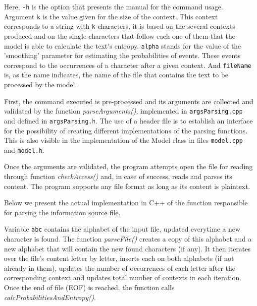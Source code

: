 \documentclass[12pt]{article}
\begin{document}
Here, \texttt{-h} is the option that presents the manual for the command usage.
Argument \texttt{k} is the value given for the size of the context.
This context corresponds to a string with \texttt{k} characters, it is based on
the several contexts produced and on the single characters that follow each one
of them that the model is able to calculate the text's entropy.
\texttt{alpha} stands for the value of the 'smoothing' parameter for estimating
the probabilities of events. 
These events correspond to the occurrences of a character after a given context.
And \texttt{fileName} is, as the name indicates, the name of the file that
contains the text to be processed by the model.

First, the command executed is pre-processed and its arguments are collected
and validated by the function {\it parseArguments()\/}, implemented in 
\texttt{argsParsing.cpp} and defined in \texttt{argsParsing.h}.
The use of a header file is to establish an interface for the possibility of
creating different implementations of the parsing functions.
This is also visible in the implementation of the Model class in files 
\texttt{model.cpp} and \texttt{model.h}.

Once the arguments are validated, the program attempts open the file for reading
through function {\it checkAccess()\/} and, in case of success, reads and parses
its content.
The program supports any file format as long as its content is plaintext.

\newpage 
Below we present the actual implementation in C++ of the function responsible 
for parsing the information source file.

Variable \texttt{abc} contains the alphabet of the input file, updated everytime
a new character is found.
The function {\it parseFile()\/} creates a copy of this alphabet and a new
alphabet that will contain the new found characters (if any).
It then iterates over the file's content letter by letter, inserts each on both
alphabets (if not already in them), updates the number of occurrences of each 
letter after the corresponding context and updates total number of contexts in 
each iteration.
Once the end of file (EOF) is reached, the function calls 
{\it calcProbabilitiesAndEntropy()\/}.
\end{document}
